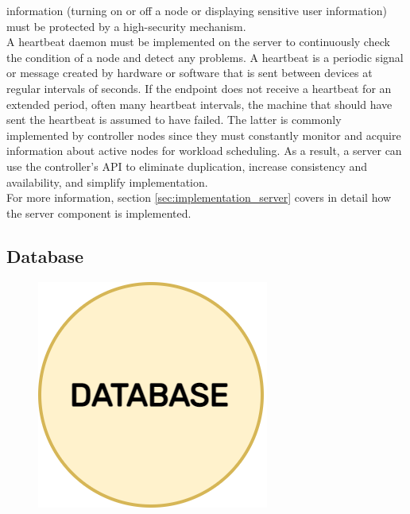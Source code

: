 information (turning on or off a node or displaying sensitive user information)
must be protected by a high-security mechanism. \\ %
A heartbeat daemon must be implemented on the server to continuously check the
condition of a node and detect any problems. A heartbeat is a periodic signal or
message created by hardware or software that is sent between devices at regular intervals
of seconds. If the endpoint does not receive a heartbeat for an extended period,
often many heartbeat intervals, the machine that should have sent the heartbeat
is assumed to have failed\cite{heartbeat}. The latter is commonly implemented by
controller nodes since they must constantly monitor and acquire information
about active nodes for workload scheduling. As a result, a server can use the
controller's API to eliminate duplication, increase consistency and availability,
and simplify implementation. \\ %
For more information, section \ref{sec:implementation_server} covers in detail how
the server component is implemented.

\subsection{Database}
\label{subsec:architecture_components_database}

\begin{figure}
  \centering
  \includegraphics[width=.2\textwidth]{images/architecture/database.png}
\end{figure}

